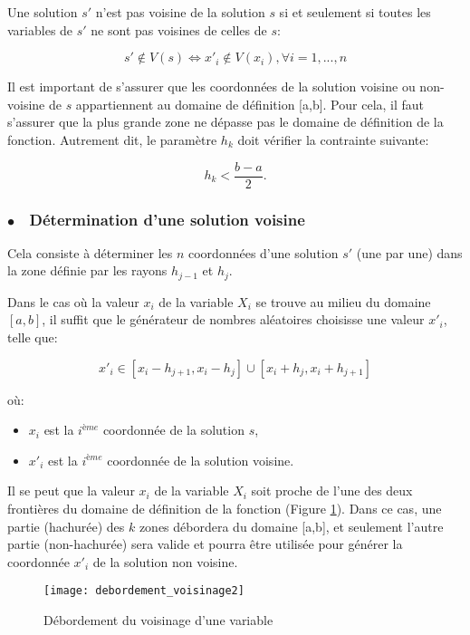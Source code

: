 Une solution $s'$ n'est pas voisine de la solution $s$ si et seulement si toutes les variables de $s'$ ne sont pas voisines de celles de $s$:

$$
s' \notin V(s) \Leftrightarrow x'_i \notin V(x_i) , \forall i=1,...,n
$$

Il est important de s'assurer que les coordonnées de la solution voisine ou non-voisine de $s$ appartiennent au domaine de définition [a,b]. Pour cela, il faut s'assurer que la plus grande zone ne dépasse pas le domaine de définition de la fonction. Autrement dit, le paramètre $h_k$ doit vérifier la contrainte suivante:

$$ 
h_k < \frac{b-a}{2}.
$$

\subsubsection{$\bullet\quad$Détermination d'une solution voisine}

Cela consiste à déterminer les $n$ coordonnées d'une solution $s'$ (une par une) dans la zone définie par les rayons $h_{j-1}$ et $h_j$.

Dans le cas où la valeur $x_i$ de la variable $X_i$ se trouve au milieu du domaine $[a,b]$, il suffit que le générateur de nombres aléatoires choisisse une valeur $x'_i$, telle que:

$$
x'_i\in[x_i-h_{j+1},x_i-h_j] \cup [x_i+h_j,x_i+h_{j+1}]
$$

où:
\begin{itemize}
	\item $x_i$ est la $i^{ème}$ coordonnée de la solution $s$,
	\item $x'_i$ est la $i^{ème}$ coordonnée de la solution voisine.\\
\end{itemize}

Il se peut que la valeur $x_i$ de la variable $X_i$ soit proche de l'une des deux frontières du domaine de définition de la fonction (Figure \ref{debordement}). Dans ce cas, une partie (hachurée) des $k$ zones débordera du domaine [a,b], et seulement l'autre partie (non-hachurée) sera valide et pourra être utilisée pour générer la coordonnée $x'_i$ de la solution non voisine. 

\vspace{-1em}

\begin{figure}[H]
	\centering 
	\texttt{[image: debordement\_voisinage2]}
	\caption{Débordement du voisinage d'une variable} 
	\label{debordement}
\end{figure}

